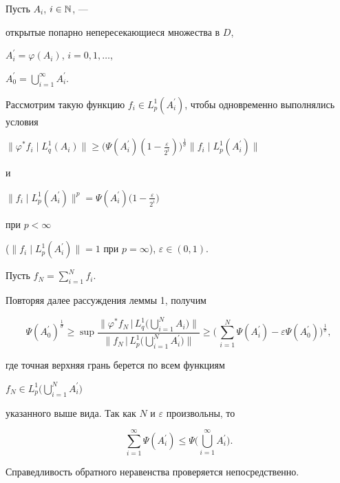\begin{pf}


Пусть $A_{i}$, $i\in {\Bbb N}$, ---


открытые попарно непересекающиеся множества в $D$,


$A_i^{\prime}=\varphi(A_{i})$, $i=0,1,\dotsc$,


$A^{\prime}_0=\bigcup\limits_{i=1}^{\infty}A_i^{\prime}$.


Рассмотрим такую функцию $f_i\in {L}_{p}^{1}


(A_i^{\prime})$, чтобы одновременно выполнялись условия


$\|\varphi^{\ast} f_i\mid {L}_{q}^{1}


(A_i)\|\geq \big(\Psi(A_i^{\prime})


(1-\frac{\varepsilon}{2^i})\big)^{\frac{1}{\sigma}}


\|f_i\mid {L}_{p}^{1}(A_i^{\prime})\|$


и


$\|f_i\mid {L}_{p}^{1}(A_i^{\prime})


\|^p=\Psi(A_i^{\prime})\big(1-\frac{\varepsilon}{2^i}\big)$


при $p<\infty$


($\|f_i\mid {L}_{p}^{1}(A_i^{\prime})


\|=1$ при $p=\infty$), $\varepsilon\in(0,1)$.


Пусть $f_N=\sum\limits_{i=1}^{N}f_i$.


Повторяя далее рассуждения леммы 1, получим


$$


\Psi(A_0^{\prime})^{\frac{1}{\sigma}}\geq\sup\frac


{\bigg\|\varphi^{\ast} f_N\,\Big|\, {L}_{q}^{1}


\Big(\bigcup\limits_{i=1}^{N}A_i\Big)\bigg\|}


{\bigg\|f_N\,\Big|\, {L}_{p}^{1}


\Big(\bigcup\limits_{i=1}^{N}A_i^{\prime}\Big)\bigg\|}\geq


\bigg(\,\sum_{i=1}^{N}\Psi(A_i^{\prime})-\varepsilon\Psi(A_0^{\prime})


\bigg)^{\frac{1}{\sigma}},


$$


где точная верхняя грань берется по всем функциям


$f_N\in {L}_{p}^{1}


\Big(\bigcup\limits_{i=1}^{N}A_i^{\prime}\Big)$


указанного выше вида. Так как $N$ и $\varepsilon$ произвольны, то


$$


\sum_{i=1}^{\infty}\Psi(A^{\prime}_i) \leq


\Psi\Big(\bigcup_{i=1}^{\infty}A_i^{\prime}\Big).


$$


Справедливость обратного неравенства проверяется непосредственно.


\end{pf}





